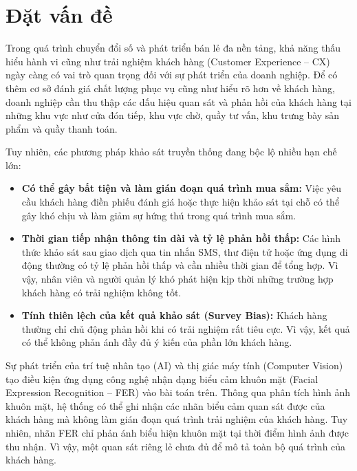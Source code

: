 \documentclass[../LuanVan.tex]{subfiles}
\begin{document}
\section{Đặt vấn đề}
\label{section:1.1}

Trong quá trình chuyển đổi số và phát triển bán lẻ đa nền tảng, khả năng thấu hiểu hành vi cũng như trải nghiệm khách hàng (Customer Experience -- CX) ngày càng có vai trò quan trọng đối với sự phát triển của doanh nghiệp. Để có thêm cơ sở đánh giá chất lượng phục vụ cũng như hiểu rõ hơn về khách hàng, doanh nghiệp cần thu thập các dấu hiệu quan sát và phản hồi của khách hàng tại những khu vực như cửa đón tiếp, khu vực chờ, quầy tư vấn, khu trưng bày sản phẩm và quầy thanh toán.

Tuy nhiên, các phương pháp khảo sát truyền thống đang bộc lộ nhiều hạn chế lớn:

\begin{itemize}
    \item \textbf{Có thể gây bất tiện và làm gián đoạn quá trình mua sắm:} Việc yêu cầu khách hàng điền phiếu đánh giá hoặc thực hiện khảo sát tại chỗ có thể gây khó chịu và làm giảm sự hứng thú trong quá trình mua sắm.
    
    \item \textbf{Thời gian tiếp nhận thông tin dài và tỷ lệ phản hồi thấp:} Các hình thức khảo sát sau giao dịch qua tin nhắn SMS, thư điện tử hoặc ứng dụng di động thường có tỷ lệ phản hồi thấp và cần nhiều thời gian để tổng hợp. Vì vậy, nhân viên và người quản lý khó phát hiện kịp thời những trường hợp khách hàng có trải nghiệm không tốt.
    
    \item \textbf{Tính thiên lệch của kết quả khảo sát (Survey Bias):} Khách hàng thường chỉ chủ động phản hồi khi có trải nghiệm rất tiêu cực. Vì vậy, kết quả có thể không phản ánh đầy đủ ý kiến của phần lớn khách hàng.
\end{itemize}

Sự phát triển của trí tuệ nhân tạo (AI) và thị giác máy tính (Computer Vision) tạo điều kiện ứng dụng công nghệ nhận dạng biểu cảm khuôn mặt (Facial Expression Recognition -- FER) vào bài toán trên. Thông qua phân tích hình ảnh khuôn mặt, hệ thống có thể ghi nhận các nhãn biểu cảm quan sát được của khách hàng mà không làm gián đoạn quá trình trải nghiệm của khách hàng. Tuy nhiên, nhãn FER chỉ phản ánh biểu hiện khuôn mặt tại thời điểm hình ảnh được thu nhận. Vì vậy, một quan sát riêng lẻ chưa đủ để mô tả toàn bộ quá trình của khách hàng.
\end{document}
